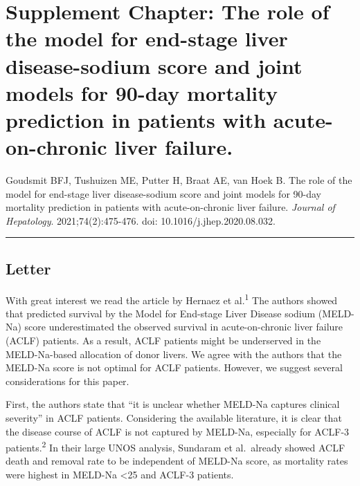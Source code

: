\documentclass[11pt,english,]{book} %
\begin{document}
\newpage
\linespread{1.213}
\normalsize

\hypertarget{chap-rolejm}{%
\section{Supplement Chapter: The role of the model for end-stage liver disease-sodium score and joint models for 90-day mortality prediction in patients with acute-on-chronic liver failure.}\label{chap-rolejm}}


\vspace*{\fill}

\noindent Goudsmit BFJ, Tushuizen ME, Putter H, Braat AE, van Hoek B. The role of the model for end-stage liver disease-sodium score and joint models for 90-day mortality prediction in patients with acute-on-chronic liver failure. \emph{Journal of Hepatology}. 2021;74(2):475-476. doi: 10.1016/j.jhep.2020.08.032.

\begin{center}\rule{0.5\linewidth}{0.5pt}\end{center}

\newpage

\hypertarget{letter-1}{%
\subsection*{Letter}\label{letter-1}}

With great interest we read the article by Hernaez et al.\textsuperscript{1} The authors showed that predicted survival by the Model for End-stage Liver Disease sodium (MELD-Na) score underestimated the observed survival in acute-on-chronic liver failure (ACLF) patients. As a result, ACLF patients might be underserved in the MELD-Na-based allocation of donor livers.
We agree with the authors that the MELD-Na score is not optimal for ACLF patients. However, we suggest several considerations for this paper.

First, the authors state that ``it is unclear whether MELD-Na captures clinical severity'' in ACLF patients. Considering the available literature, it is clear that the disease course of ACLF is not captured by MELD-Na, especially for ACLF-3 patients.\textsuperscript{2} In their large UNOS analysis, Sundaram et al.~already showed ACLF death and removal rate to be independent of MELD-Na score, as mortality rates were highest in MELD-Na \textless25 and ACLF-3 patients.
\end{document}
